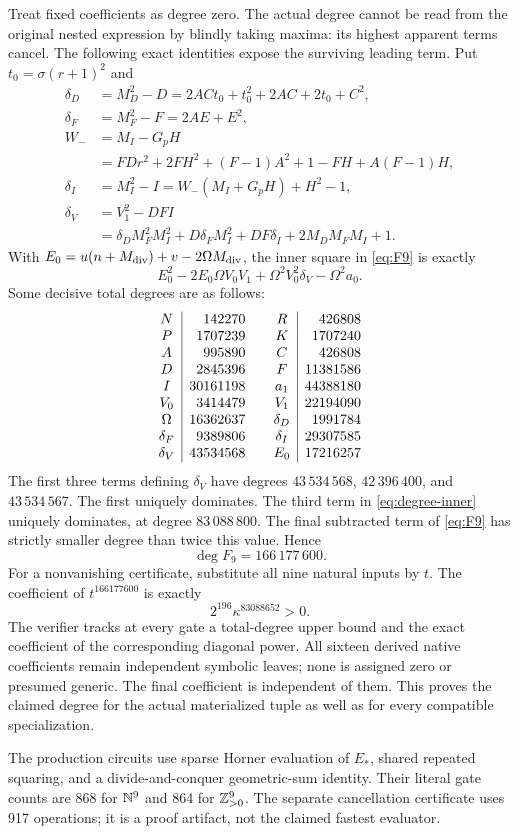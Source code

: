 Treat fixed coefficients as degree zero. The actual degree cannot
be read from the original nested expression by blindly taking
maxima: its highest apparent terms cancel. The following exact
identities expose the surviving leading term. Put
$t_0=\sigma(r+1)^2$ and
\begin{align*}
 \delta_D&=M_D^2-D=2ACt_0+t_0^2+2AC+2t_0+C^2,\\
 \delta_F&=M_F^2-F=2AE+E^2,\\
 W_-&=M_I-G_pH\\
 &=FDr^2+2FH^2+(F-1)A^2+1-FH+A(F-1)H,\\
 \delta_I&=M_I^2-I=W_-(M_I+G_pH)+H^2-1,\\
 \delta_V&=V_1^2-DFI\\
 &=\delta_DM_F^2M_I^2+D\delta_FM_I^2+DF\delta_I
                      +2M_DM_FM_I+1.
\end{align*}
With $E_0=u(n+M_{\rm div})+v-2\Omega M_{\rm div}$, the inner
square in \eqref{eq:F9} is exactly
\begin{equation}
 E_0^2-2E_0\Omega V_0V_1+\Omega^2V_0^2\delta_V-\Omega^2a_0.
 \label{eq:degree-inner}
\end{equation}
Some decisive total degrees are as follows:
\[
\begin{array}{c|r@{\qquad}c|r}
 N&142270&R&426808\\
 P&1707239&K&1707240\\
 A&995890&C&426808\\
 D&2845396&F&11381586\\
 I&30161198&a_1&44388180\\
 V_0&3414479&V_1&22194090\\
 \Omega&16362637&\delta_D&1991784\\
 \delta_F&9389806&\delta_I&29307585\\
 \delta_V&43534568&E_0&17216257
\end{array}
\]
The first three terms defining $\delta_V$ have degrees
$43\,534\,568$, $42\,396\,400$, and $43\,534\,567$.
The first uniquely dominates. The third term in
\eqref{eq:degree-inner} uniquely dominates, at degree $83\,088\,800$.
The final subtracted term of \eqref{eq:F9} has strictly smaller degree
than twice this value. Hence
\begin{equation}
 \boxed{\deg F_9=166\,177\,600.}
 \label{eq:degree9}
\end{equation}
For a nonvanishing certificate, substitute all nine natural inputs by
$t$. The coefficient of $t^{166177600}$ is exactly
\[
 \boxed{2^{196}\kappa^{83088652}>0.}
\]
The verifier tracks at every gate a total-degree upper bound and the
exact coefficient of the corresponding diagonal power. All sixteen
derived native coefficients remain independent symbolic leaves; none
is assigned zero or presumed generic. The final coefficient is
independent of them. This proves the claimed degree for the actual
materialized tuple as well as for every compatible specialization.

The production circuits use sparse Horner evaluation of $E_*$,
shared repeated squaring, and a divide-and-conquer geometric-sum
identity. Their literal gate counts are 868 for $\mathbb N^9$ and 864 for
$\mathbb Z_{>0}^9$. The separate cancellation certificate uses 917 operations;
it is a proof artifact, not the claimed fastest evaluator.
